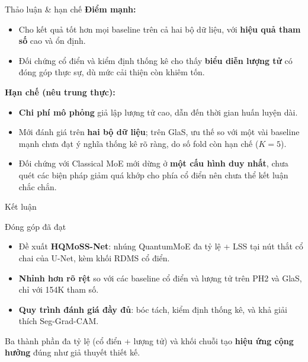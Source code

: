 \documentclass[aspectratio=169,11pt]{beamer}
\newcommand{\hl}[1]{\textcolor{hcmusblue}{\textbf{#1}}}
\newcommand{\acc}[1]{\textcolor{hcmusaccent}{\textbf{#1}}}
\begin{document}
\begin{frame}{Thảo luận \& hạn chế}
  \textbf{Điểm mạnh:}
  \begin{itemize}
    \item Cho kết quả tốt hơn mọi baseline trên cả hai bộ dữ liệu, với \hl{hiệu quả tham số} cao và ổn định.
    \item Đối chứng cổ điển và kiểm định thống kê cho thấy \hl{biểu diễn lượng tử} có đóng góp thực sự, dù mức cải thiện còn khiêm tốn.
  \end{itemize}
  \textbf{Hạn chế (nêu trung thực):}
  \begin{itemize}
    \item \acc{Chi phí mô phỏng} giả lập lượng tử cao, dẫn đến thời gian huấn luyện dài.
    \item Mới đánh giá trên \acc{hai bộ dữ liệu}; trên GlaS, ưu thế so với một vài baseline mạnh chưa đạt ý nghĩa thống kê rõ ràng, do số fold còn hạn chế ($K{=}5$).
    \item Đối chứng với Classical MoE mới dừng ở \acc{một cấu hình duy nhất}, chưa quét các biện pháp giảm quá khớp cho phía cổ điển nên chưa thể kết luận chắc chắn.
  \end{itemize}
\end{frame}

\begin{frame}{Kết luận}
  \begin{block}{Đóng góp đã đạt}
    \begin{itemize}
      \item Đề xuất \hl{HQMoSS-Net}: nhúng QuantumMoE đa tỷ lệ + LSS tại nút thắt cổ chai của U-Net, kèm khối RDMS cổ điển.
      \item \hl{Nhỉnh hơn rõ rệt} so với các baseline cổ điển và lượng tử trên PH2 và GlaS, chỉ với 154K tham số.
      \item \hl{Quy trình đánh giá đầy đủ}: bóc tách, kiểm định thống kê, và khả giải thích Seg-Grad-CAM.
    \end{itemize}
  \end{block}
  \centering\small Ba thành phần đa tỷ lệ (cổ điển + lượng tử) và khối chuỗi tạo \acc{hiệu ứng cộng hưởng} đúng như giả thuyết thiết kế.
\end{frame}
\end{document}
